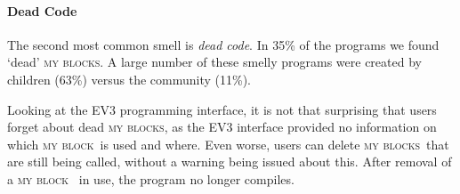 \documentclass[conference]{IEEEtran}
\newcommand{\mbs}{\textsc{my blocks}}
\newcommand{\mb}{\textsc{my block}}
\begin{document}
%

\paragraph{Dead Code}
The second most common smell is \emph{dead code}. In 35\% of the programs we found `dead' \mbs. A large number of these smelly programs were created by children (63\%) versus the community (11\%). 

Looking at the EV3 programming interface, it is not that surprising that users forget about dead \mbs, as the EV3 interface provided no information on which \mb~is used and where. Even worse, users can delete \mbs~that are still being called, without a warning being issued about this. After removal of a \mb~ in use, the program no longer compiles.

\end{document}
